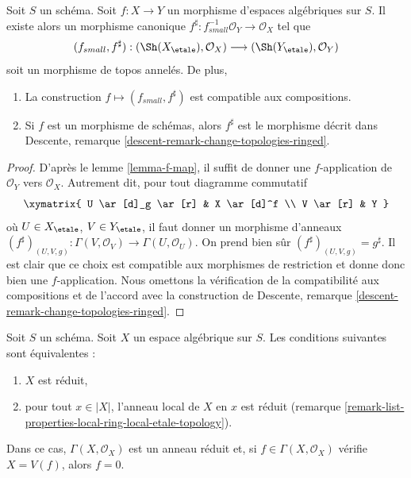\begin{lemma}
\label{lemma-morphism-ringed-topoi}
Soit $S$ un schéma.
Soit $f : X \to Y$ un morphisme d'espaces algébriques sur $S$.
Il existe alors un morphisme canonique
$f^\sharp : f_{small}^{-1}\mathcal{O}_Y \to \mathcal{O}_X$ tel que
$$
(f_{small}, f^\sharp) :
(\Sh(X_\etale), \mathcal{O}_X)
\longrightarrow
(\Sh(Y_\etale), \mathcal{O}_Y)
$$
soit un morphisme de topos annelés. De plus,
\begin{enumerate}
\item La construction $f \mapsto (f_{small}, f^\sharp)$ est compatible aux
compositions.
\item Si $f$ est un morphisme de schémas, alors $f^\sharp$ est le morphisme décrit dans
Descente, remarque \ref{descent-remark-change-topologies-ringed}.
\end{enumerate}
\end{lemma}

\begin{proof}
D'après le lemme \ref{lemma-f-map}, il suffit de donner une $f$-application de
$\mathcal{O}_Y$ vers $\mathcal{O}_X$. Autrement dit, pour tout
diagramme commutatif
$$
\xymatrix{
U \ar[d]_g \ar[r] & X \ar[d]^f \\
V \ar[r] & Y
}
$$
où $U \in X_\etale$, $V \in Y_\etale$, il faut donner un
morphisme d'anneaux
$
(f^\sharp)_{(U, V, g)} :
\Gamma(V, \mathcal{O}_V)
\to
\Gamma(U, \mathcal{O}_U).
$
On prend bien sûr $(f^\sharp)_{(U, V, g)} = g^\sharp$.
Il est clair que ce choix est compatible aux morphismes de restriction
et donne donc bien une $f$-application.
Nous omettons la vérification de la compatibilité aux compositions et de l'accord avec la
construction de
Descente, remarque \ref{descent-remark-change-topologies-ringed}.
\end{proof}

\begin{lemma}
\label{lemma-reduced-space}
Soit $S$ un schéma. Soit $X$ un espace algébrique sur $S$.
Les conditions suivantes sont équivalentes :
\begin{enumerate}
\item $X$ est réduit,
\item pour tout $x \in |X|$, l'anneau local de $X$ en $x$ est
réduit (remarque \ref{remark-list-properties-local-ring-local-etale-topology}).
\end{enumerate}
Dans ce cas, $\Gamma(X, \mathcal{O}_X)$ est un anneau réduit et,
si $f \in \Gamma(X, \mathcal{O}_X)$ vérifie $X = V(f)$, alors $f = 0$.
\end{lemma}

